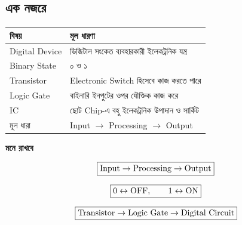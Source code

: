 
\subsection{এক নজরে}

\begin{center}
\begin{tabularx}{\textwidth}{|L{0.28\textwidth}|Y|}
\hline
{}
\textbf{বিষয়} &
\textbf{মূল ধারণা} \\
\hline

\textenglish{Digital Device} &
ডিজিটাল সংকেত ব্যবহারকারী ইলেকট্রনিক যন্ত্র \\
\hline

\textenglish{Binary State} &
০ ও ১ \\
\hline

\textenglish{Transistor} &
\textenglish{Electronic Switch} হিসেবে কাজ করতে পারে \\
\hline

\textenglish{Logic Gate} &
বাইনারি ইনপুটের ওপর যৌক্তিক কাজ করে \\
\hline

\textenglish{IC} &
ছোট \textenglish{Chip}-এ বহু ইলেকট্রনিক উপাদান ও সার্কিট \\
\hline

মূল ধারা &
\textenglish{Input}
$\rightarrow$
\textenglish{Processing}
$\rightarrow$
\textenglish{Output} \\
\hline

\end{tabularx}
\end{center}


\par\begingroup

\textbf{মনে রাখবে}

\[
\boxed{
\text{\textenglish{Input}}
\rightarrow
\text{\textenglish{Processing}}
\rightarrow
\text{\textenglish{Output}}
}
\]

\[
\boxed{
0\leftrightarrow\text{\textenglish{OFF}},
\qquad
1\leftrightarrow\text{\textenglish{ON}}
}
\]

\[
\boxed{
\text{\textenglish{Transistor}}
\rightarrow
\text{\textenglish{Logic Gate}}
\rightarrow
\text{\textenglish{Digital Circuit}}
}
\]
\par\endgroup


